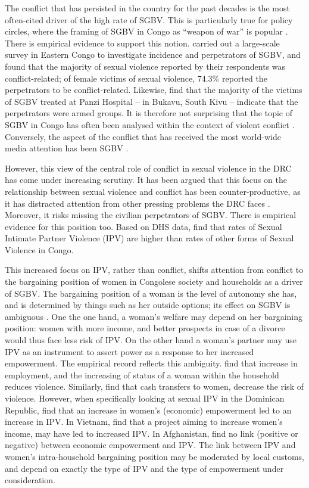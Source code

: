 The conflict that has persisted in the country for the past decades is the most often-cited driver of the high rate of SGBV.  This is particularly true for policy circles, where the framing of SGBV in Congo as ``weapon of war'' is popular \citep{Baaz2013,Kirby2015}. There is empirical evidence to support this notion. \cite{Johnson2010} carried out a large-scale survey in Eastern Congo to investigate incidence and perpetrators of SGBV, and found that the majority of sexual violence reported by their respondents was conflict-related; of female victims of sexual violence, 74.3\% reported the perpetrators to be conflict-related. Likewise, \citet{Bartels2013} find that the majority of the victims of SGBV treated at Panzi Hospital -- in Bukavu, South Kivu -- indicate that the perpetrators were armed groups. It is therefore not surprising that the topic of SGBV in Congo has often been analysed within the context of violent conflict \citep{Baaz2013}. Conversely, the aspect of the conflict that has received the most world-wide media attention has been SGBV \citep{Autesserre2012a}.  

However, this view of the central role of conflict in sexual violence in the DRC has come under increasing scrutiny. It has been argued that this focus on the relationship between sexual violence and conflict has been counter-productive, as it has distracted attention from other pressing problems the DRC faces \citep{Autesserre2012a, Hilhorst2018,Porter2019}. Moreover, it risks missing the civilian perpetrators of SGBV. There is empirical evidence for this position too. Based on DHS data, \cite{Peterman2011} find that rates of Sexual Intimate Partner Violence (IPV) are higher than rates of other forms of Sexual Violence in Congo. 

This increased focus on IPV, rather than conflict, shifts attention from conflict to the bargaining position of women in Congolese society and households as a driver of SGBV. The bargaining position of a woman is the level of autonomy she has, and is determined by things such as her outside options; its effect on SGBV is ambiguous \citep{Eswaran2011}. One the one hand, a woman's welfare may depend on her bargaining position: women with more income, and better prospects in case of a divorce would thus face less risk of IPV. On the other hand a  woman's partner may use IPV as an instrument to assert power as a response to her increased empowerment. The empirical record reflects this ambiguity. \cite{Bhattacharya} find that increase in employment, and the increasing of status of a woman within the household reduces violence. Similarly, \cite{Hidrobo2016} find that cash transfers to women, decrease the risk of violence. However, when specifically looking at sexual IPV in the Dominican Republic, \cite{Bueno2017} find that an increase in women's (economic) empowerment led to an increase in IPV. In Vietnam, \citep{Bulte2019} find that a project aiming to increase women's income, may have led to increased IPV. In Afghanistan, \cite{Gibbs2020} find no link (positive or negative) between economic empowerment and IPV. The link between IPV and women's intra-household bargaining position may be moderated by local customs, and depend on exactly the type of IPV and the type of empowerment under consideration.

